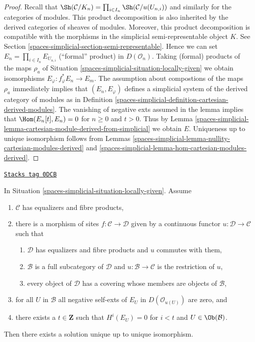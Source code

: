 \begin{proof}
Recall that
$\Sh(\mathcal{C}/K_n) = \prod_{i \in I_n} \Sh(\mathcal{C}/u(U_{n, i}))$
and similarly for the categories of modules. This product decomposition
is also inherited by the derived categories of sheaves of modules.
Moreover, this product decomposition is compatible with
the morphisms in the simplicial semi-representable object $K$.
See Section \ref{spaces-simplicial-section-semi-representable}.
Hence we can set $E_n = \prod_{i \in I_n} E_{U_{n, i}}$
(``formal'' product) in $D(\mathcal{O}_n)$.
Taking (formal) products of the maps $\rho_a$ of
Situation \ref{spaces-simplicial-situation-locally-given}
we obtain isomorphisms $E_\varphi : f_\varphi^*E_n \to E_m$.
The assumption about compostions of the maps $\rho_a$
immediately implies that $(E_n, E_\varphi)$
defines a simplicial system of the derived category of modules
as in Definition \ref{spaces-simplicial-definition-cartesian-derived-modules}.
The vanishing of negative exts assumed in the lemma implies that
$\Hom(E_n[t], E_n) = 0$ for $n \geq 0$ and $t > 0$.
Thus by
Lemma \ref{spaces-simplicial-lemma-cartesian-module-derived-from-simplicial}
we obtain $E$.
Uniqueness up to unique isomorphism follows from
Lemmas \ref{spaces-simplicial-lemma-nullity-cartesian-modules-derived} and
\ref{spaces-simplicial-lemma-hom-cartesian-modules-derived}.
\end{proof}

\begin{lemma}

\label{spaces-simplicial-lemma-bbd-glueing}
\href{https://stacks.math.columbia.edu/tag/0DCB}{\texttt{Stacks tag 0DCB}}

In Situation \ref{spaces-simplicial-situation-locally-given}. Assume
\begin{enumerate}
\item $\mathcal{C}$ has equalizers and fibre products,
\item there is a morphism of sites $f : \mathcal{C} \to \mathcal{D}$
given by a continuous functor $u : \mathcal{D} \to \mathcal{C}$
such that
\begin{enumerate}
\item $\mathcal{D}$ has equalizers and fibre products and $u$
commutes with them,
\item $\mathcal{B}$ is a full subcategory of $\mathcal{D}$
and $u : \mathcal{B} \to \mathcal{C}$ is the restriction of $u$,
\item every object of $\mathcal{D}$ has a covering whose members
are objects of $\mathcal{B}$,
\end{enumerate}
\item for all $U$ in $\mathcal{B}$ all negative self-exts of $E_U$
in $D(\mathcal{O}_{u(U)})$ are zero, and
\item there exists a $t \in \mathbf{Z}$ such that $H^i(E_U) = 0$ for $i < t$
and $U \in \Ob(\mathcal{B})$.
\end{enumerate}
Then there exists a solution unique up to unique isomorphism.
\end{lemma}

